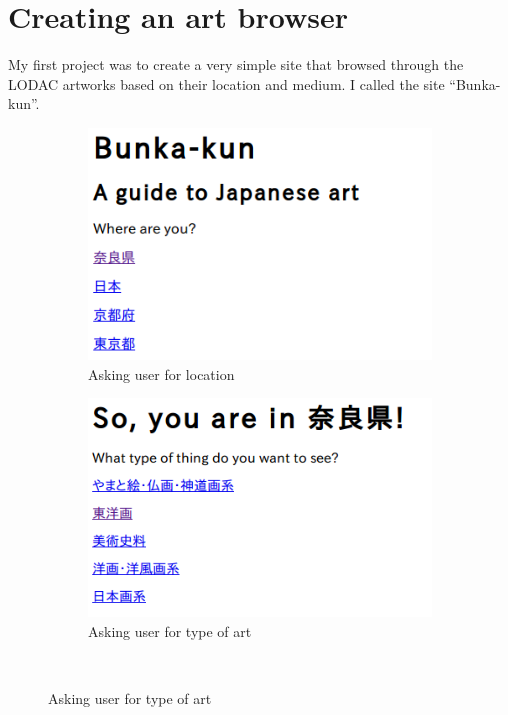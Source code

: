 \documentclass[11pt]{article}
\begin{document}
\section{Creating an art browser}
My first project was to create a very simple site that browsed through the LODAC artworks based on their location and medium. I called the site ``Bunka-kun''.

\begin{figure}
  \centering
  \begin{subfigure}[b]{0.4\textwidth}
          \includegraphics[width=\textwidth]{bunka1.png}
          \caption{Asking user for location}
          \label{fig:bunka1}
  \end{subfigure}
  \begin{subfigure}[b]{0.4\textwidth}
    \includegraphics[width=\textwidth]{bunka2.png}
    \caption{Asking user for type of art} \label{fig:bunka2}
  \end{subfigure}\

\end{figure}
\end{document}
